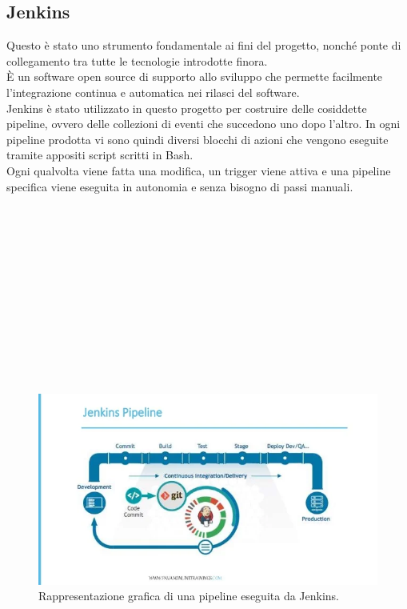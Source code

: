 \documentclass[a4paper,12pt]{report}
\begin{document}
\subsection{Jenkins}
Questo è stato uno strumento fondamentale ai fini del progetto, nonché ponte di collegamento tra tutte le tecnologie introdotte finora. \\
È un software open source di supporto allo sviluppo che permette facilmente l'integrazione continua e automatica nei rilasci del software.\cite{jenkins}\\
Jenkins è stato utilizzato in questo progetto per costruire delle cosiddette pipeline, ovvero delle collezioni di eventi che succedono uno dopo l'altro. 
In ogni pipeline prodotta vi sono quindi diversi blocchi di azioni che vengono eseguite tramite appositi script scritti in Bash. \\
Ogni qualvolta viene fatta una modifica, un trigger viene attiva e una pipeline specifica viene eseguita in autonomia e senza bisogno di passi manuali. \\ \\ \\ \\ \\ \\ \\ \\ \\ \\ \\ \\ \\
\begin{figure}[h]
	\includegraphics[width=1.0\textwidth]{jenkins}
    \caption{Rappresentazione grafica di una pipeline eseguita da Jenkins. \cite{jenkinsimg}}
    \label{fig:jenkins}
\end{figure}
\end{document}
